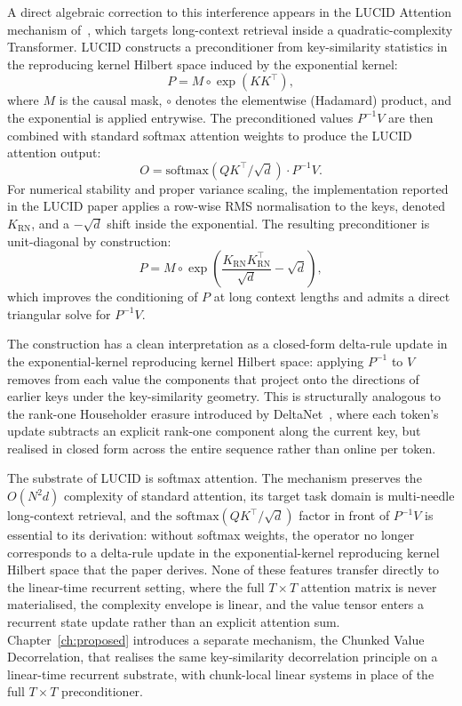 A direct algebraic correction to this interference appears in the
LUCID Attention mechanism of~\citet{duvvuri2026lucid}, which targets
long-context retrieval inside a quadratic-complexity Transformer.
LUCID constructs a preconditioner from key-similarity statistics in
the reproducing kernel Hilbert space induced by the exponential
kernel:
\begin{equation}\label{eq:lucid-base}
P = M \circ \exp(K K^{\top}),
\end{equation}
where $M$ is the causal mask, $\circ$ denotes the elementwise
(Hadamard) product, and the exponential is applied entrywise. The
preconditioned values $P^{-1} V$ are then combined with standard
softmax attention weights to produce the LUCID attention output:
\begin{equation}\label{eq:lucid-output}
O = \mathrm{softmax}(Q K^{\top} / \sqrt{d}) \cdot P^{-1} V.
\end{equation}
For numerical stability and proper variance scaling, the
implementation reported in the LUCID paper applies a row-wise RMS
normalisation to the keys, denoted $K_{\mathrm{RN}}$, and a
$-\sqrt{d}$ shift inside the exponential. The resulting preconditioner
is unit-diagonal by construction:
\begin{equation}\label{eq:lucid-rn}
P = M \circ \exp\!\left( \frac{K_{\mathrm{RN}} K_{\mathrm{RN}}^{\top}}{\sqrt{d}} - \sqrt{d} \right),
\end{equation}
which improves the conditioning of $P$ at long context lengths and
admits a direct triangular solve for $P^{-1} V$.

The construction has a clean interpretation as a closed-form
delta-rule update in the exponential-kernel reproducing kernel
Hilbert space: applying $P^{-1}$ to $V$ removes from each value the
components that project onto the directions of earlier keys under the
key-similarity geometry. This is structurally analogous to the
rank-one Householder erasure introduced by
DeltaNet~\cite{schlag2021deltanet,yang2024deltanet}, where each
token's update subtracts an explicit rank-one component along the
current key, but realised in closed form across the entire sequence
rather than online per token.

The substrate of LUCID is softmax attention. The mechanism preserves
the $O(N^{2} d)$ complexity of standard attention, its target task
domain is multi-needle long-context retrieval, and the
$\mathrm{softmax}(Q K^{\top} / \sqrt{d})$ factor in front of
$P^{-1} V$ is essential to its derivation: without softmax weights,
the operator no longer corresponds to a delta-rule update in the
exponential-kernel reproducing kernel Hilbert space that the paper
derives. None of these features transfer directly to the linear-time
recurrent setting, where the full $T \times T$ attention matrix is
never materialised, the complexity envelope is linear, and the value
tensor enters a recurrent state update rather than an explicit
attention sum. Chapter~\ref{ch:proposed} introduces a separate
mechanism, the Chunked Value Decorrelation, that realises the
same key-similarity decorrelation principle on a linear-time
recurrent substrate, with chunk-local linear systems in place of
the full $T \times T$ preconditioner.

